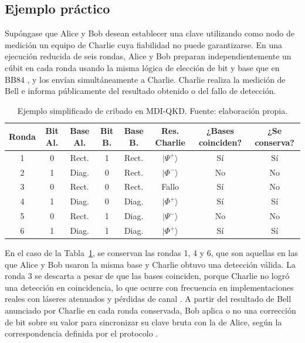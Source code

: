 \subsection{Ejemplo práctico}
 
Supóngase que Alice y Bob desean establecer una clave utilizando como nodo de medición un equipo de Charlie cuya fiabilidad no puede garantizarse. En una ejecución reducida de seis rondas, Alice y Bob preparan independientemente un cúbit en cada ronda usando la misma lógica de elección de bit y base que en BB84 \citep{bennett1984}, y los envían simultáneamente a Charlie. Charlie realiza la medición de Bell e informa públicamente del resultado obtenido o del fallo de detección.
 
\begin{table}[h]
    \centering
    \small
    \begin{tabular}{c c c c c c c c}
        \hline\hline
        Ronda & Bit Al. & Base Al. & Bit B. & Base B. & Res. Charlie & ¿Bases coinciden? & ¿Se conserva? \\
        \hline
        1 & 0 & Rect. & 1 & Rect. & $|\Psi^+\rangle$ & Sí  & Sí \\
        2 & 1 & Diag. & 0 & Rect. & $|\Phi^-\rangle$ & No  & No \\
        3 & 0 & Rect. & 0 & Rect. & Fallo            & Sí  & No \\
        4 & 1 & Diag. & 0 & Diag. & $|\Phi^+\rangle$ & Sí  & Sí \\
        5 & 0 & Rect. & 1 & Diag. & $|\Psi^-\rangle$ & No  & No \\
        6 & 1 & Diag. & 1 & Diag. & $|\Phi^+\rangle$ & Sí  & Sí \\
        \hline
    \end{tabular}
    \caption[Ejemplo de cribado en MDI-QKD]{Ejemplo simplificado de cribado en MDI-QKD. Fuente: elaboración propia.}
    \label{tab:mdiqkd_ejemplo}
\end{table}
 
En el caso de la Tabla~\ref{tab:mdiqkd_ejemplo}, se conservan las rondas 1, 4 y 6, que son aquellas en las que Alice y Bob usaron la misma base y Charlie obtuvo una detección válida. La ronda 3 se descarta a pesar de que las bases coinciden, porque Charlie no logró una detección en coincidencia, lo que ocurre con frecuencia en implementaciones reales con láseres atenuados y pérdidas de canal \citep{lo2012,curty2014}. A partir del resultado de Bell anunciado por Charlie en cada ronda conservada, Bob aplica o no una corrección de bit sobre su valor para sincronizar su clave bruta con la de Alice, según la correspondencia definida por el protocolo \citep{lo2012}.
 
